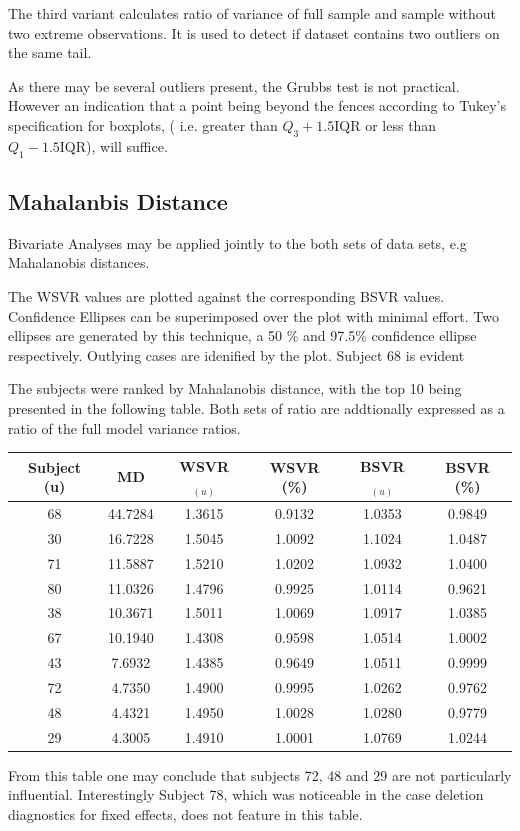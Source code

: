 \documentclass[12pt, a4paper]{report}
\theoremstyle{plain}
\theoremstyle{definition}
\theoremstyle{remark}
\begin{document}
The third variant calculates ratio of variance of full sample and sample without two extreme observations.
It is used to detect if dataset contains two outliers on the same tail.

As there may be several outliers present, the Grubbs test is not practical. However an indication that a point being beyond the fences according to Tukey's 
specification for boxplots, ( i.e. greater than $Q_3 +1.5 \mbox{IQR}$ or less than $Q_1 - 1.5 \mbox{IQR}$), will suffice.

\subsection{Mahalanbis Distance}
Bivariate Analyses may be applied jointly to the both sets of data sets, e.g Mahalanobis distances.

The WSVR values are plotted against the corresponding BSVR values. Confidence Ellipses can be superimposed over the plot with minimal effort. Two ellipses are generated by this technique, a 50 \% and 97.5\% confidence ellipse respectively. Outlying cases are idenified by the plot. Subject 68 is evident

The subjects were ranked by Mahalanobis distance, with the top 10 being presented in the following table. Both sets of ratio are addtionally expressed as a ratio of the full model variance ratios. 
\begin{center}
	\begin{tabular}{|c|c|c|c|c|c|}
		\hline
		Subject (u) &  MD & WSVR$_{(u)}$ & WSVR (\%) & BSVR$_{(u)}$   & BSVR (\%)     \\ \hline \hline
		68 & 44.7284   & 1.3615  & 0.9132   & 1.0353  & 0.9849 \\ \hline
		30 & 16.7228   & 1.5045  & 1.0092   & 1.1024  & 1.0487 \\ \hline
		71 & 11.5887   & 1.5210  & 1.0202   & 1.0932  & 1.0400 \\ \hline
		80 & 11.0326   & 1.4796  & 0.9925   & 1.0114  & 0.9621 \\ \hline 
		38 & 10.3671   & 1.5011  & 1.0069   & 1.0917  & 1.0385 \\ \hline 
		67 & 10.1940   & 1.4308  & 0.9598   & 1.0514  & 1.0002 \\ \hline
		43  & 7.6932   & 1.4385  & 0.9649   & 1.0511  & 0.9999 \\ \hline
		72  & 4.7350   & 1.4900  & 0.9995   & 1.0262  & 0.9762 \\ \hline
		48  & 4.4321   & 1.4950  & 1.0028   & 1.0280  & 0.9779 \\ \hline
		29  & 4.3005   & 1.4910  & 1.0001   & 1.0769  & 1.0244 \\ \hline
	\end{tabular} 
\end{center}
From this table one may conclude that subjects 72, 48 and 29 are not particularly influential. Interestingly Subject 78, which was noticeable in the case deletion diagnostics for fixed effects, does not feature in this table.
\end{document}
